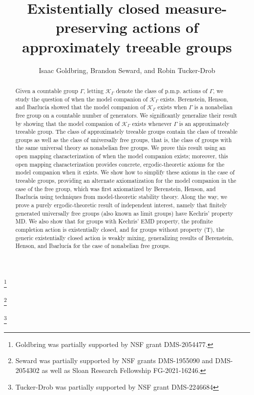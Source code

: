 \documentclass[12pt]{amsart}
\theoremstyle{definition}
\def\cal{\mathcal}
\newcommand{\pmp}{p{$.$}m{$.$}p{$.$}}
\begin{document}

\title[E.c.\ p.m.p. actions of approximately treeable groups]{Existentially closed measure-preserving actions of approximately treeable groups}


\author{Isaac Goldbring, Brandon Seward, and Robin Tucker-Drob}
\address{Department of Mathematics\\University of California, Irvine, 340 Rowland Hall (Bldg.\# 400),
Irvine, CA 92697-3875}
\thanks{Goldbring was partially supported by NSF grant DMS-2054477.}
\address{Department of Mathematics\\University of California, San Diego, 9500 Gilman Drive {\#}0112, La Jolla, CA 92093-0112}
\thanks{Seward was partially supported by NSF grants DMS-1955090 and DMS-2054302 as well as Sloan Research Fellowship FG-2021-16246.}
\address{Department of Mathematics\\University of Florida, 1400 Stadium Rd, Gainesville, FL 32611-1927}
\thanks{Tucker-Drob was partially supported by NSF grant DMS-2246684}



\begin{abstract}
Given a countable group $\Gamma$, letting $\mathcal{K}_\Gamma$ denote the class of {\pmp} actions of $\Gamma$, we study the question of when the model companion of $\mathcal{K}_\Gamma$ exists.  Berenstein, Henson, and Ibarluc\'ia showed that the model companion of $\mathcal{K}_\Gamma$ exists when $\Gamma$ is a nonabelian free group on a countable number of generators.  We significantly generalize their result by showing that the model companion of $\cal K_\Gamma$ exists whenever $\Gamma$ is an approximately treeable group.  The class of approximately treeable groups contain the class of treeable groups as well as the class of universally free groups, that is, the class of groups with the same universal theory as nonabelian free groups.  We prove this result using an open mapping characterization of when the model companion exists; moreover, this open mapping characterization provides concrete, ergodic-theoretic axioms for the model companion when it exists.  We show how to simplify these axioms in the case of treeable groups, providing an alternate axiomatization for the model companion in the case of the free group, which was first axiomatized by Berenstein, Henson, and Ibarluc\'ia using techniques from model-theoretic stability theory.  Along the way, we prove a purely ergodic-theoretic result of independent interest, namely that finitely generated universally free groups (also known as limit groups) have Kechris' property MD.  We also show that for groups with Kechris' EMD property, the profinite completion action is existentially closed, and for groups without property (T), the generic existentially closed action is weakly mixing, generalizing results of Berenstein, Henson, and Ibarluc\'ia for the case of nonabelian free groups.
\end{abstract}
\end{document}
